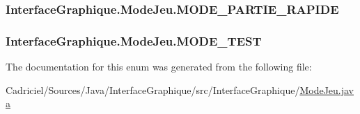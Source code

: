 \hypertarget{enum_interface_graphique_1_1_mode_jeu_aa18a0fa455af8be0edef086145d26a43}{
\subsubsection[{M\-O\-D\-E\-\_\-\-P\-A\-R\-T\-I\-E\-\_\-\-R\-A\-P\-I\-D\-E}]{\setlength{\rightskip}{0pt plus 5cm}Interface\-Graphique.\-Mode\-Jeu.\-M\-O\-D\-E\-\_\-\-P\-A\-R\-T\-I\-E\-\_\-\-R\-A\-P\-I\-D\-E}}\label{enum_interface_graphique_1_1_mode_jeu_aa18a0fa455af8be0edef086145d26a43}
\hypertarget{enum_interface_graphique_1_1_mode_jeu_a9d195d987725b39d401c0af0e650b7f1}{
\subsubsection[{M\-O\-D\-E\-\_\-\-T\-E\-S\-T}]{\setlength{\rightskip}{0pt plus 5cm}Interface\-Graphique.\-Mode\-Jeu.\-M\-O\-D\-E\-\_\-\-T\-E\-S\-T}}\label{enum_interface_graphique_1_1_mode_jeu_a9d195d987725b39d401c0af0e650b7f1}


The documentation for this enum was generated from the following file\-:\begin{DoxyCompactItemize}
\item 
Cadriciel/\-Sources/\-Java/\-Interface\-Graphique/src/\-Interface\-Graphique/\hyperlink{_mode_jeu_8java}{Mode\-Jeu.\-java}\end{DoxyCompactItemize}
